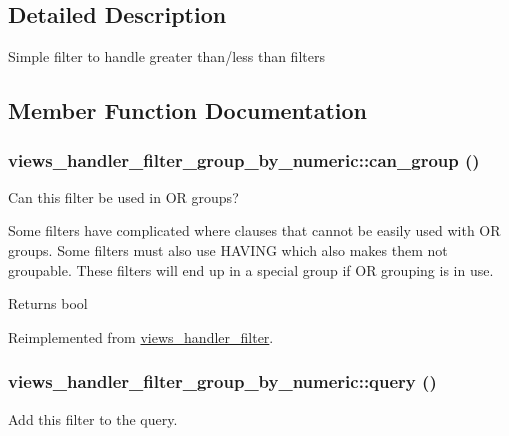\subsection{Detailed Description}
Simple filter to handle greater than/less than filters 

\subsection{Member Function Documentation}
\hypertarget{classviews__handler__filter__group__by__numeric_a9c16e172f827009497a1a6bac7782b3b}{
\subsubsection[{can\_\-group}]{\setlength{\rightskip}{0pt plus 5cm}views\_\-handler\_\-filter\_\-group\_\-by\_\-numeric::can\_\-group ()}}
\label{classviews__handler__filter__group__by__numeric_a9c16e172f827009497a1a6bac7782b3b}
Can this filter be used in OR groups?

Some filters have complicated where clauses that cannot be easily used with OR groups. Some filters must also use HAVING which also makes them not groupable. These filters will end up in a special group if OR grouping is in use.

\begin{DoxyReturn}{Returns}
bool 
\end{DoxyReturn}


Reimplemented from \hyperlink{classviews__handler__filter_a34aea08dca7f859afaff0f66610724bd}{views\_\-handler\_\-filter}.\hypertarget{classviews__handler__filter__group__by__numeric_a8d87dd77b6df159704256e7ff452c8ce}{
\subsubsection[{query}]{\setlength{\rightskip}{0pt plus 5cm}views\_\-handler\_\-filter\_\-group\_\-by\_\-numeric::query ()}}
\label{classviews__handler__filter__group__by__numeric_a8d87dd77b6df159704256e7ff452c8ce}
Add this filter to the query.


